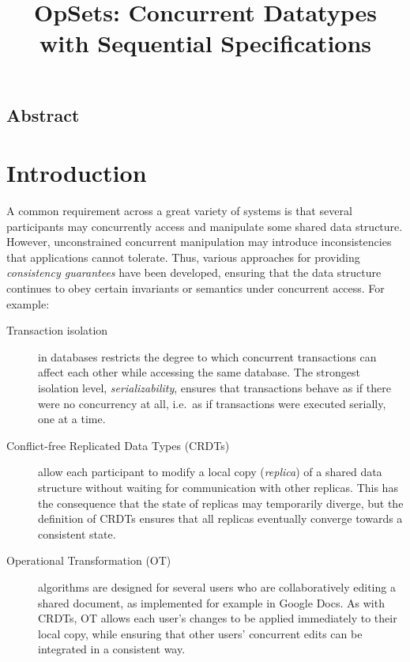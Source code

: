 \documentclass[twocolumn,10pt]{article}
\begin{document}
\sloppy
\title{OpSets: Concurrent Datatypes with Sequential Specifications}
\author{}
\date{}
\maketitle

\subsection*{Abstract}

\section{Introduction}

A common requirement across a great variety of systems is that several participants may concurrently access and manipulate some shared data structure.
However, unconstrained concurrent manipulation may introduce inconsistencies that applications cannot tolerate.
Thus, various approaches for providing \emph{consistency guarantees} have been developed, ensuring that the data structure continues to obey certain invariants or semantics under concurrent access. For example:

\begin{description}
\item[Transaction isolation] in databases restricts the degree to which concurrent transactions can affect each other while accessing the same database.
The strongest isolation level, \emph{serializability}, ensures that transactions behave as if there were no concurrency at all, i.e.\ as if transactions were executed serially, one at a time.

\item[Conflict-free Replicated Data Types (CRDTs)] allow each participant to modify a local copy (\emph{replica}) of a shared data structure without waiting for communication with other replicas.
This has the consequence that the state of replicas may temporarily diverge, but the definition of CRDTs ensures that all replicas eventually converge towards a consistent state.

\item[Operational Transformation (OT)] algorithms are designed for several users who are collaboratively editing a shared document, as implemented for example in Google Docs.
As with CRDTs, OT allows each user's changes to be applied immediately to their local copy, while ensuring that other users' concurrent edits can be integrated in a consistent way.
\end{description}
\end{document}
